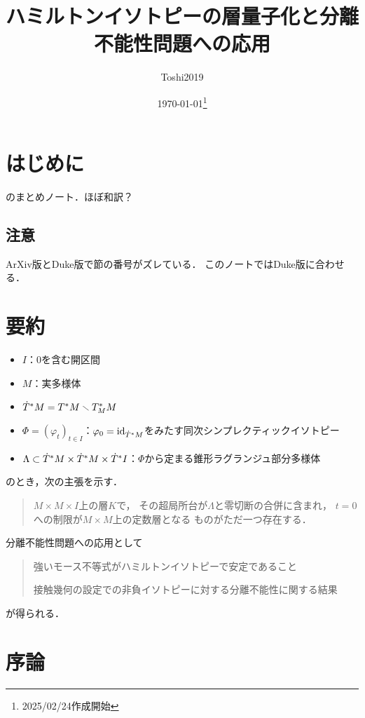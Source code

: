 \title{ハミルトンイソトピーの層量子化と分離不能性問題への応用}
\author{Toshi2019}
\date{\today\footnote{2025/02/24作成開始}}

\maketitle
\tableofcontents
\section*{はじめに}
\cite{GKS12}のまとめノート．ほぼ和訳？
\subsection*{注意}
ArXiv版とDuke版で節の番号がズレている．
このノートではDuke版に合わせる．
\section*{要約}
\begin{itemize}
    \item \(I\)：\(0\)を含む開区間
    \item \(M\)：実多様体
    \item \(\cotn[M]=\cotb[M]\smallsetminus\cotz[M]\)
    \item \(\varPhi=\left(\varphi_{t}\right)_{t\in I}\)：\(\varphi_0=\id_{\cotn[M]}\)をみたす同次シンプレクティックイソトピー
    \item \(\Lambda\subset\cotn[M]\times\cotn[M]\times\cotn[I]\)：\(\varPhi\)から定まる錐形ラグランジュ部分多様体
\end{itemize}
のとき，次の主張を示す．
\begin{quote}
    \(M\times M\times I\)上の層\(K\)で，
    その超局所台が\(\Lambda\)と零切断の合併に含まれ，
    \(t=0\)への制限が\(M\times M\)上の定数層となる
    ものがただ一つ存在する．
\end{quote}
分離不能性問題への応用として
\begin{quote}
    強いモース不等式がハミルトンイソトピーで安定であること
    
    接触幾何の設定での非負イソトピーに対する分離不能性に関する結果
\end{quote}
が得られる．

\section*{序論}

